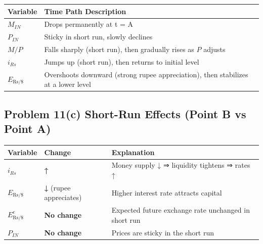 \documentclass[
]{article}
\begin{document}
\begin{longtable}[]{@{}
  >{\raggedright\arraybackslash}p{}
  >{\raggedright\arraybackslash}p{}@{}}
\toprule\noalign{}
\begin{minipage}[b]{\linewidth}\raggedright
Variable
\end{minipage} & \begin{minipage}[b]{\linewidth}\raggedright
Time Path Description
\end{minipage} \\
\midrule\noalign{}
\endhead
\bottomrule\noalign{}
\endlastfoot
\(M_{IN}\) & Drops permanently at t = A \\
\(P_{IN}\) & Sticky in short run, slowly declines \\
\(M/P\) & Falls sharply (short run), then gradually rises as \(P\)
adjusts \\
\(i_{Rs}\) & Jumps up (short run), then returns to initial level \\
\(E_{\text{Rs}/\$}\) & Overshoots downward (strong rupee appreciation),
then stabilizes at a lower level \\
\end{longtable}

\subsection{Problem 11(c) Short-Run Effects (Point B vs Point
A)}\label{problem-11c-short-run-effects-point-b-vs-point-a}

\begin{longtable}[]{@{}
  >{\raggedright\arraybackslash}p{}
  >{\raggedright\arraybackslash}p{}
  >{\raggedright\arraybackslash}p{}@{}}
\toprule\noalign{}
\begin{minipage}[b]{\linewidth}\raggedright
Variable
\end{minipage} & \begin{minipage}[b]{\linewidth}\raggedright
Change
\end{minipage} & \begin{minipage}[b]{\linewidth}\raggedright
Explanation
\end{minipage} \\
\midrule\noalign{}
\endhead
\bottomrule\noalign{}
\endlastfoot
\(i_{Rs}\) & \textbf{↑} & Money supply ↓ ⇒ liquidity tightens ⇒ rates
↑ \\
\(E_{\text{Rs}/\$}\) & \textbf{↓} (rupee appreciates) & Higher interest
rate attracts capital \\
\(E^e_{\text{Rs}/\$}\) & \textbf{No change} & Expected future exchange
rate unchanged in short run \\
\(P_{IN}\) & \textbf{No change} & Prices are sticky in the short run \\
\end{longtable}
\end{document}
